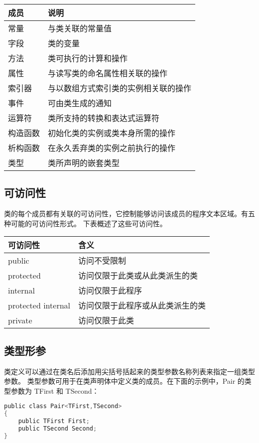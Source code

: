 \begin{tabular}{|l|l|}
\hline
成员 &  说明   \\
\hline
常量   &         与类关联的常量值 \\
字段   &         类的变量 \\
方法   &         类可执行的计算和操作 \\
属性   &         与读写类的命名属性相关联的操作 \\
索引器  &      与以数组方式索引类的实例相关联的操作 \\
事件   &         可由类生成的通知 \\
运算符  &      类所支持的转换和表达式运算符 \\
构造函数 &   初始化类的实例或类本身所需的操作 \\
析构函数 &   在永久丢弃类的实例之前执行的操作 \\
类型   &         类所声明的嵌套类型 \\
\hline
\end{tabular}

\subsection{可访问性}
类的每个成员都有关联的可访问性，它控制能够访问该成员的程序文本区域。有五种可能的可访问性形式。
下表概述了这些可访问性。

\begin{tabular}{|l|l|}
\hline
可访问性  &   含义  \\
\hline
public        &  访问不受限制   \\
protected  &  访问仅限于此类或从此类派生的类  \\
internal    & 访问仅限于此程序  \\
protected internal  & 访问仅限于此程序或从此类派生的类  \\
private & 访问仅限于此类  \\
\hline
\end{tabular}

\subsection{ 类型形参}

类定义可以通过在类名后添加用尖括号括起来的类型参数名称列表来指定一组类型参数。
类型参数可用于在类声明体中定义类的成员。在下面的示例中，Pair 的类型参数为 TFirst 和 TSecond：

 \begin{lstlisting}[language=C] 
public class Pair<TFirst,TSecond>
{
    public TFirst First;
    public TSecond Second;
}
 \end{lstlisting}

